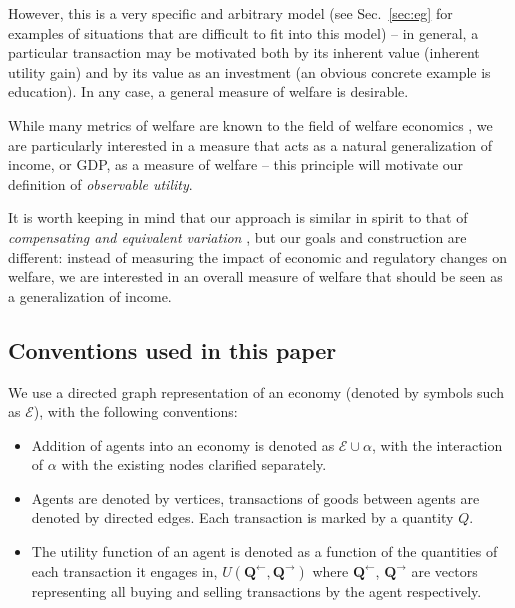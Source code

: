 \documentclass{journal}
\theoremstyle{plain}
\theoremstyle{definition}
\theoremstyle{remark}
\newcommand{\economy}{\ensuremath{\mathcal{E}}}
\newcommand{\quants}{\ensuremath{Q}} %
\newcommand{\quantl}{\ensuremath{\mathbf{Q}}} %
\newcommand{\agenta}{\ensuremath{\alpha}}
\newcommand{\utility}{\ensuremath{U}}
\begin{document}
However, this is a very specific and arbitrary model (see Sec.~\ref{sec:eg} for examples of situations that are difficult to fit into this model) -- in general, a particular transaction may be motivated both by its inherent value (inherent utility gain) and by its value as an investment (an obvious concrete example is education). In any case, a general measure of welfare is desirable.

While many metrics of welfare are known to the field of welfare economics \cite{eia}, we are particularly interested in a measure that acts as a natural generalization of income, or GDP, as a measure of welfare -- this principle will motivate our definition of \emph{observable utility}. 

It is worth keeping in mind that our approach is similar in spirit to that of \emph{compensating and equivalent variation} \cite{hicks}\cite{tb}, but our goals and construction are different: instead of measuring the impact of economic and regulatory changes on welfare, we are interested in an overall measure of welfare that should be seen as a generalization of income.

\subsection{Conventions used in this paper}
\label{sec:conv}

We use a directed graph representation of an economy (denoted by symbols such as $\economy$), with the following conventions:
\begin{itemize}
    \item Addition of agents into an economy is denoted as $\economy\cup \agenta$, with the interaction of $\agenta$ with the existing nodes clarified separately.
    \item Agents are denoted by vertices, transactions of goods between agents are denoted by directed edges. Each transaction is marked by a quantity $\quants$.
    \item The utility function of an agent is denoted as a function of the quantities of each transaction it engages in, $\utility(\quantl^\leftarrow, \quantl^\rightarrow)$ where $\quantl^\leftarrow$, $\quantl^\rightarrow$ are vectors representing all buying and selling transactions by the agent respectively.
\end{itemize}
\end{document}
